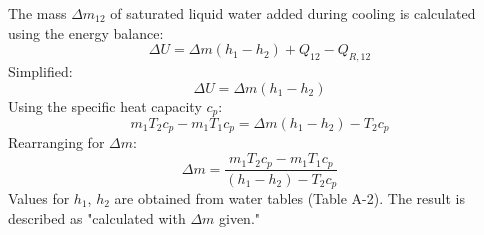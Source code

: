 The mass \( \Delta m_{12} \) of saturated liquid water added during cooling is calculated using the energy balance:  
\[
\Delta U = \Delta m (h_1 - h_2) + Q_{12} - Q_{R,12}
\]  
Simplified:  
\[
\Delta U = \Delta m (h_1 - h_2)
\]  
Using the specific heat capacity \( c_p \):  
\[
m_1 T_2 c_p - m_1 T_1 c_p = \Delta m (h_1 - h_2) - T_2 c_p
\]  
Rearranging for \( \Delta m \):  
\[
\Delta m = \frac{m_1 T_2 c_p - m_1 T_1 c_p}{(h_1 - h_2) - T_2 c_p}
\]  
Values for \( h_1 \), \( h_2 \) are obtained from water tables (Table A-2). The result is described as "calculated with \( \Delta m \) given."